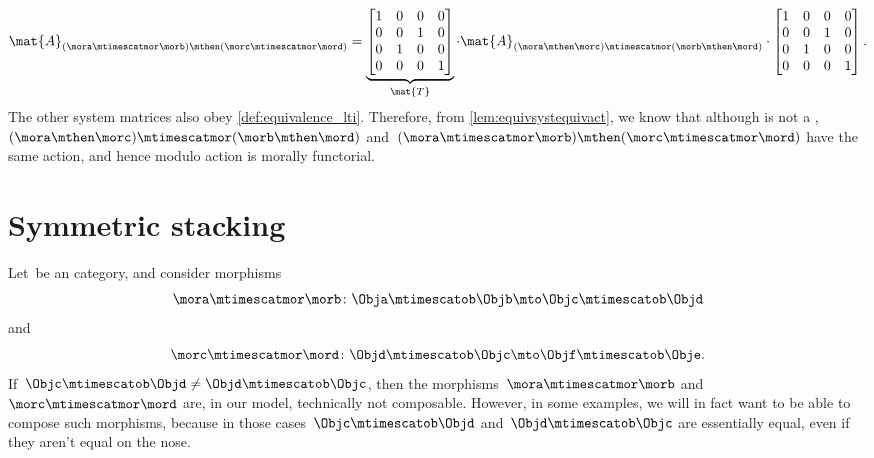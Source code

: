\begin{example}
    \begin{equation}
        \mat{A}_{(\mora\mtimescatmor \morb)\mthen (\morc\mtimescatmor \mord)}=
        \underbrace{\begin{bmatrix}
                1 & 0 & 0 & 0 \\
                0 & 0 & 1 & 0 \\
                0 & 1 & 0 & 0 \\
                0 & 0 & 0 & 1
            \end{bmatrix}}_{\mat{T}}\cdot
        \mat{A}_{(\mora \mthen \morc)\mtimescatmor (\morb\mthen \mord)}
        \cdot
        \begin{bmatrix}
            1 & 0 & 0 & 0 \\
            0 & 0 & 1 & 0 \\
            0 & 1 & 0 & 0 \\
            0 & 0 & 0 & 1
        \end{bmatrix}.
    \end{equation}
    The other system matrices also obey \cref{def:equivalence_lti}.
    Therefore, from \cref{lem:equivsystequivact}, we know that although \LTI is not a ,~$(\mora \mthen \morc)\mtimescatmor (\morb\mthen \mord)$ and~$(\mora\mtimescatmor \morb)\mthen (\morc\mtimescatmor \mord)$ have the same action, and hence \LTI modulo action is morally functorial.
\end{example}

\section{Symmetric stacking}

Let~\CatC be an   category, and consider morphisms
\begin{equation}
    \mora \mtimescatmor \morb \colon \Obja \mtimescatob \Objb \mto \Objc \mtimescatob \Objd
\end{equation}
and
\begin{equation}
    \morc \mtimescatmor \mord \colon \Objd \mtimescatob \Objc \mto \Objf \mtimescatob \Obje.
\end{equation}
If~$\Objc \mtimescatob \Objd \neq \Objd \mtimescatob \Objc$, then the morphisms~$\mora \mtimescatmor \morb$ and~$\morc \mtimescatmor \mord$ are, in our model, technically not composable.
However, in some examples, we will in fact want to be able to compose such morphisms, because in those cases~$\Objc \mtimescatob \Objd$ and~$\Objd \mtimescatob \Objc$ are essentially equal, even if they aren't equal on the nose.


